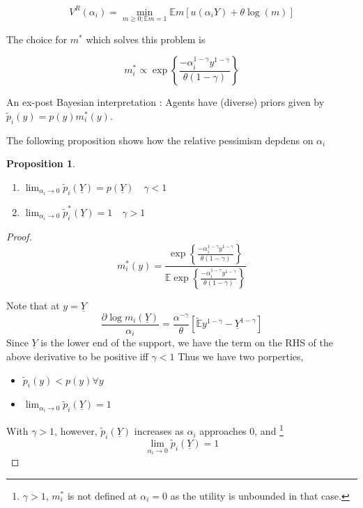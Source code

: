\documentclass[12pt]{article}
\newtheorem{proposition}{Proposition}
\begin{document}
\[V^R (\alpha_i)=\min_{m \geq0;\mathbb{E}m=1}\mathbb{E}m[u(\alpha_iY)+\theta\log(m)]\]

\noindent  The choice for $m^*$ which solves this problem is

\[m_i^*\propto \exp\left\{\frac {-\alpha^{1-\gamma}_iy^{1-\gamma}}{\theta(1-\gamma)}\right\}\]

\noindent An ex-post Bayesian interpretation : Agents have (diverse) priors given by $\tilde{p}_i(y)=p(y)m^*_i(y)$. 

\noindent  The following proposition shows how the relative pessimism depdens on $\alpha_i$

\begin{proposition}
\label{propo-1}
\begin{enumerate}
	\item $\lim_{\alpha_i \to 0} \tilde{p}_i(\underline{Y})=p(\underline{Y}) \quad \gamma < 1$
	\item $\lim_{\alpha_i \to 0} \tilde{p}_i^*(\underline{Y})=1  \quad \gamma > 1$
\end{enumerate}
\end{proposition}
\begin{proof}
\[m^*_i(y)=\frac{\exp\left\{\frac {-\alpha^{1-\gamma}_iy^{1-\gamma}}{\theta(1-\gamma)}\right\} }{\mathbb{E}\exp\left\{\frac {-\alpha^{1-\gamma}_iy^{1-\gamma}}{\theta(1-\gamma)}\right\} }\]

Note that at $y=\underline{Y}$
\[\frac{\partial \log m_i(\underline{Y}) }{\alpha_i} = \frac{\alpha^{-\gamma}}{\theta}\left[ \tilde{\mathbb{E}} y^{1-\gamma} -\underline{Y}^{1-\gamma}\right]\]
Since $\underline {Y} $ is the lower end of the support, we have the term on the RHS of the above derivative to be positive iff $\gamma < 1$ Thus we have two porperties,
	\begin{itemize}
          \item $\tilde{p}_i(y) < p(y) \forall y$
          \item $\lim_{\alpha_i \to 0} \tilde{p}_i(\underline{Y})=1$
         \end{itemize}

With $\gamma > 1$, however, $\tilde{p}_i(\underline{Y})$ increases as $\alpha_i$ approaches 0, and \footnote{$\gamma > 1$, $m^*_i$ is not defined at $\alpha_i=0$ as the utility is unbounded in that case.} 
\[\lim_{\alpha_i \to 0}\tilde{p}_i(\underline{Y}) = 1\]



\end{proof}
\end{document}
